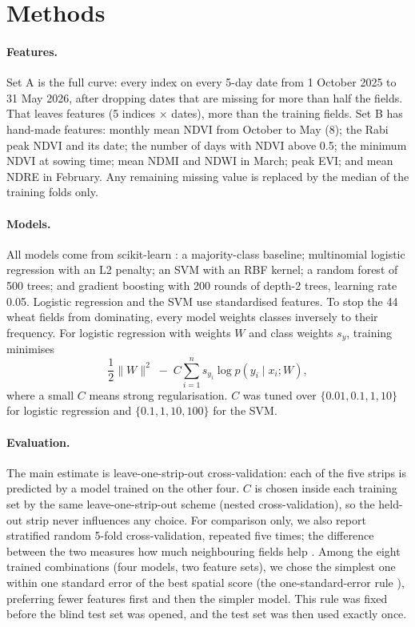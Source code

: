 \documentclass[10pt]{article}
\begin{document}
\section{Methods}

\paragraph{Features.} Set A is the full curve: every index on every 5-day date from 1 October 2025 to
31 May 2026, after dropping dates that are missing for more than half the fields. That leaves
\NFeatA{} features (5 indices $\times$ \NDatesA{} dates), more than the \NTrain{} training fields.
Set B has \NFeatB{} hand-made features: monthly mean NDVI from October to May (8); the Rabi peak NDVI
and its date; the number of days with NDVI above 0.5; the minimum NDVI at sowing time; mean NDMI and
NDWI in March; peak EVI; and mean NDRE in February. Any remaining missing value is replaced by the
median of the training folds only.

\paragraph{Models.} All models come from scikit-learn \cite{pedregosa2011sklearn}: a majority-class
baseline; multinomial logistic regression with an L2 penalty; an SVM with an RBF kernel; a random
forest \cite{breiman2001rf} of 500 trees; and gradient boosting \cite{friedman2001gbm} with 200 rounds
of depth-2 trees, learning rate 0.05. Logistic regression and the SVM use standardised features. To
stop the 44 wheat fields from dominating, every model weights classes inversely to their frequency.
For logistic regression with weights $W$ and class weights $s_y$, training minimises
\begin{equation}
  \frac{1}{2}\lVert W \rVert^2 \;-\; C \sum_{i=1}^{n} s_{y_i} \log p(y_i \mid x_i; W),
\end{equation}
where a small $C$ means strong regularisation. $C$ was tuned over $\{0.01, 0.1, 1, 10\}$ for logistic
regression and $\{0.1, 1, 10, 100\}$ for the SVM.

\paragraph{Evaluation.} The main estimate is leave-one-strip-out cross-validation: each of the five
strips is predicted by a model trained on the other four. $C$ is chosen inside each training set by the
same leave-one-strip-out scheme (nested cross-validation), so the held-out strip never influences any
choice. For comparison only, we also report stratified random 5-fold cross-validation, repeated five
times; the difference between the two measures how much neighbouring fields help
\cite{roberts2017cv}. Among the eight trained combinations (four models, two feature sets), we chose the simplest one
within one standard error of the best spatial score (the one-standard-error rule
\cite{hastie2009esl}), preferring fewer features first and then the simpler model. This rule was
fixed before the blind test set was opened, and the test set was then used exactly once.
\end{document}
